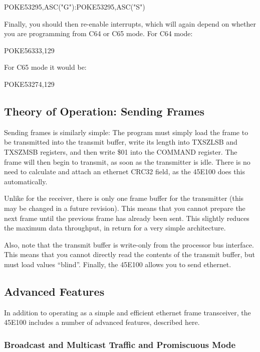 \begin{screenoutput}
POKE53295,ASC("G"):POKE53295,ASC("S")
\end{screenoutput}

Finally, you should then re-enable interrupts, which will again depend on whether you are programming from C64 or C65 mode.  For C64 mode:

\begin{screenoutput}
POKE56333,129
\end{screenoutput}

For C65 mode it would be:

\begin{screenoutput}
POKE53274,129
\end{screenoutput}



\subsection{Theory of Operation: Sending Frames}

Sending frames is similarly simple: The program must simply load the frame to be transmitted into
the transmit buffer, write its length into TXSZLSB and TXSZMSB registers, and then write \$01 into
the COMMAND register.  The frame will then begin to transmit, as soon as the transmitter is idle.
There is no need to calculate and attach an ethernet CRC32 field, as the 45E100 does this automatically.

Unlike for the receiver, there is only one frame buffer for the transmitter (this may be changed in
a future revision). This means that you cannot prepare the next frame until the previous frame has
already been sent.  This slightly reduces the maximum data throughput, in return for a very simple
architecture.

Also, note that the transmit buffer is write-only from the processor bus interface. This means that
you cannot directly read the contents of the transmit buffer, but must load values ``blind''.  Finally,
the 45E100 allows you to send ethernet.

\subsection{Advanced Features}

In addition to operating as a simple and efficient ethernet frame transceiver, the 45E100
includes a number of advanced features, described here.

\subsubsection{Broadcast and Multicast Traffic and Promiscuous Mode}

